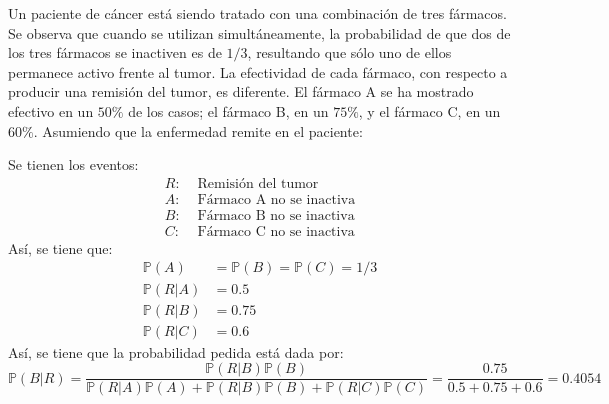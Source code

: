 
\addpoints
\question[10] Un paciente de cáncer está siendo tratado con una combinación de tres fármacos. Se observa que cuando
se utilizan simultáneamente, la probabilidad de que dos de los tres fármacos se inactiven es de $1/3$, resultando que sólo
uno de ellos permanece activo frente al tumor. La efectividad de cada fármaco, con respecto a producir una remisión del tumor, es diferente.
El fármaco A se ha mostrado efectivo en un $50\%$ de los casos; el fármaco B, en un $75\%$, y el  fármaco C, en un $60\%$.
Asumiendo que la enfermedad remite en el paciente:
\noaddpoints
{}
\begin{solution}
    Se tienen los eventos:
    \begin{align*}
        R:& \text{ Remisión del tumor}\\
        A:& \text{ Fármaco A no se inactiva}\\
        B:& \text{ Fármaco B no se inactiva}\\
        C:& \text{ Fármaco C no se inactiva}
    \end{align*}
Así, se tiene que:
\begin{align*}
    \mathbb{P}(A)&=\mathbb{P}(B)=\mathbb{P}(C)=1/3\\
    \mathbb{P}(R|A)&=0.5\\
    \mathbb{P}(R|B)&=0.75\\
    \mathbb{P}(R|C)&=0.6
\end{align*}
Así, se tiene que la probabilidad pedida está dada por:
$$\mathbb{P}(B|R)=\dfrac{\mathbb{P}(R|B)\mathbb{P}(B)}{\mathbb{P}(R|A)\mathbb{P}(A)+\mathbb{P}(R|B)\mathbb{P}(B)+\mathbb{P}(R|C)\mathbb{P}(C)}=\dfrac{0.75}{0.5+0.75+0.6}=0.4054$$
\end{solution}
